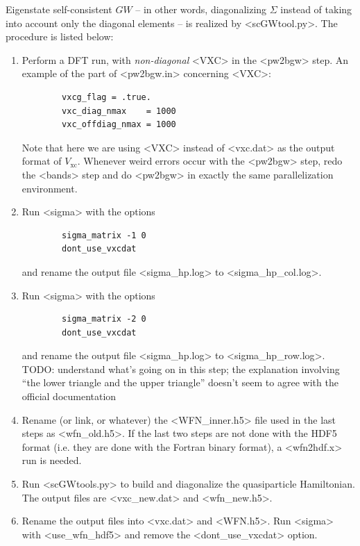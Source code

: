 \documentclass[hyperref, a4paper]{report}
\def\texttt#1{<#1>}%
\newcommand{\shortcode}[1]{\texttt{#1}}
\begin{document}
Eigenstate self-consistent $GW$ 
-- in other words, diagonalizing $\Sigma$ instead of taking into account only the diagonal elements -- 
is realized by \shortcode{scGWtool.py}.
The procedure is listed below: 
\begin{enumerate}
    \item Perform a DFT run, with \emph{non-diagonal} \shortcode{VXC} in the \shortcode{pw2bgw} step. 
        An example of the part of \shortcode{pw2bgw.in} concerning \shortcode{VXC}:
        \begin{lstlisting}
        vxcg_flag = .true.
        vxc_diag_nmax    = 1000
        vxc_offdiag_nmax = 1000 
        \end{lstlisting}
        Note that here we are using \shortcode{VXC} instead of \shortcode{vxc.dat} 
        as the output format of $V_{\text{xc}}$.
        Whenever weird errors occur with the \shortcode{pw2bgw} step, 
        redo the \shortcode{bands} step 
        and do \shortcode{pw2bgw} in exactly the same parallelization environment.
    \item Run \shortcode{sigma} with the options 
        \begin{lstlisting}
        sigma_matrix -1 0
        dont_use_vxcdat
        \end{lstlisting}
        and rename the output file \shortcode{sigma_hp.log} to \shortcode{sigma_hp_col.log}.
    \item Run \shortcode{sigma} with the options 
        \begin{lstlisting}
        sigma_matrix -2 0
        dont_use_vxcdat
        \end{lstlisting}
        and rename the output file \shortcode{sigma_hp.log} to \shortcode{sigma_hp_row.log}.
        TODO: understand what's going on in this step; 
        the explanation involving ``the lower triangle and the upper triangle''
        doesn't seem to agree with the official documentation
    \item Rename (or link, or whatever) the \shortcode{WFN_inner.h5} file used in the last steps
        as \shortcode{wfn_old.h5}. 
        If the last two steps are not done with 
        the HDF5 format (i.e. they are done with the Fortran binary format),
        a \shortcode{wfn2hdf.x} run is needed. 
    \item Run \shortcode{scGWtools.py} to build and diagonalize the quasiparticle Hamiltonian.
        The output files are \shortcode{vxc_new.dat} and \shortcode{wfn_new.h5}. 
    \item Rename the output files into \shortcode{vxc.dat} and \shortcode{WFN.h5}. 
        Run \shortcode{sigma} with \shortcode{use_wfn_hdf5} 
        and remove the \shortcode{dont_use_vxcdat} option.
\end{enumerate}
\end{document}
